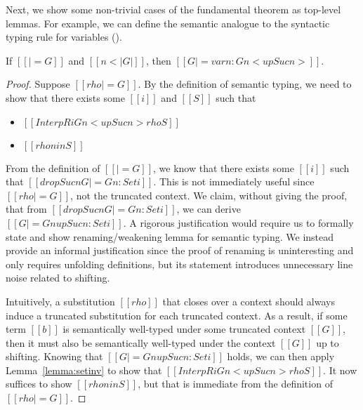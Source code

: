 \documentclass[acmsmall,screen=true,
\ifpublic review=false\else,review=true\fi
  ,anonymous=\ifanonymous true\else false\fi]{acmart}
\begin{document}
Next, we show some non-trivial cases of the fundamental theorem as
top-level lemmas. For example, we can define the semantic analogue to the
syntactic typing rule for variables ().
\begin{lemma}[ST-Var]
  \label{lemma:stvar}
  If $[[|= G]]$ and $[[n < |G|]]$, then $[[G |= var n : G n < up Suc n  >]]$.
\end{lemma}
\begin{proof}
  Suppose $[[rho |= G]]$. By the definition of semantic typing, we
need to show that there exists some $[[i]]$ and $[[S]]$ such that
  \begin{itemize}
  \item $[[InterpR i G n < up Suc n > { rho } S]]$
  \item $[[rho n in S]]$
  \end{itemize}
  From the definition of $[[|= G]]$, we know that there exists some
  $[[i]]$ such that $[[drop Suc n G |= G n : Set i]]$. This is not
  immediately useful since $[[rho |= G]]$, not the truncated
  context. We claim, without giving the proof, that from $[[drop Suc n
  G |= G n  : Set i]]$, we can derive $[[G |= G n {up Suc n} : Set
  i]]$. A rigorous justification would require us to formally state
  and show renaming/weakening lemma for semantic typing. We instead
  provide an informal justification since the proof of renaming
  is uninteresting and only requires unfolding definitions, but its
  statement introduces unnecessary line noise related to shifting.

  Intuitively, a substitution $[[rho]]$
  that closes over a context should always induce a truncated
  substitution for each truncated context. As a result, if
  some term $[[b]]$ is semantically well-typed under some truncated
  context $[[G]]$, then it must also be semantically well-typed under
  the context $[[G]]$ up to shifting.
%
  Knowing that $[[G |= G n {up Suc n} : Set i]]$ holds, we can then
  apply Lemma~\ref{lemma:setinv} to show that
  $[[InterpR i G n < up Suc n > { rho } S]]$. It now
  suffices to show $[[rho n in S]]$, but that is immediate from the
  definition of $[[rho |= G]]$.
\end{proof}
\end{document}
